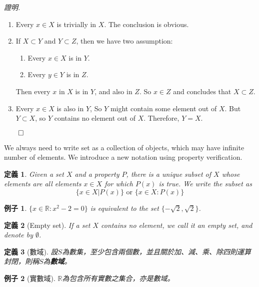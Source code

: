 \documentclass[12pt]{article}
\newtheorem{definition}{定義}
\newtheorem*{example}{例子}
\renewenvironment*{proof}{\textit{證明.}}{\hfill$\qed$}
\begin{document}
    \begin{proof}
        \begin{enumerate}
            \item Every $x\in X$ is trivially in $X$. The conclusion is obvious.
            \item If $X\subset Y$ and $Y\subset Z$, then we have two assumption:\begin{enumerate}
                \item Every $x\in X$ is in $Y$.
                \item Every $y\in Y$ is in $Z$.
            \end{enumerate}
            Then every $x$ in $X$ is in $Y$, and also in $Z$. So $x\in Z$ and concludes that $X\subset Z$.
            \item Every $x\in X$ is also in $Y$, So $Y$ might contain some element out of $X$. But $Y\subset X$, so $Y$ contains no element out of $X$. Therefore, $Y=X$. 
        \end{enumerate}
    \end{proof}

    We always need to write set as a collection of objects, which may have infinite number of elements. We introduce a new notation using property verification.

    \begin{definition}
        Given a set $X$ and a property $P$, there is a unique subset of $X$ whose elements are all elements $x\in X$ for which $P(x)$ is true. We write the subset as $$\{x\in X|P(x)\}\textrm{ or }\{x\in X:P(x)\}$$
    \end{definition}

    \begin{example}
        $\{x\in\mathbb{R}:x^2-2=0\}$ is equivalent to the set $\{-\sqrt{2},\sqrt{2}\}$.
    \end{example}

    \begin{definition}[Empty set]
        If a set $X$ contains no element, we call it an empty set, and denote by $\emptyset$.
    \end{definition}

    \begin{definition}[數域]
        設$S$為數集，至少包含兩個數，並且關於加、減、乘、除四則運算封閉，則稱$S$為\textbf{數域}。
    \end{definition}

    \begin{example}[實數域]
        $\mathbb{R}$為包含所有實數之集合，亦是數域。
    \end{example}
\end{document}
